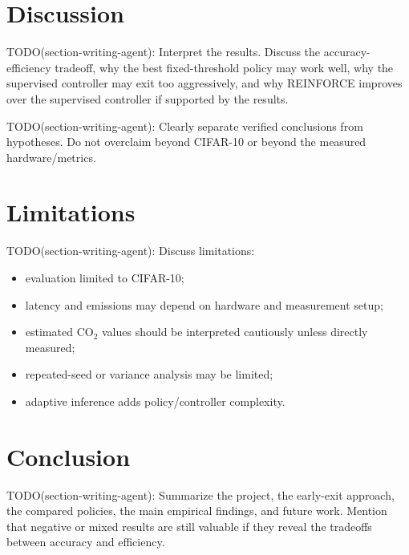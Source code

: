 \documentclass[10pt,twocolumn]{article}
\newcommand{\dataset}{CIFAR-10}
\begin{document}
\section{Discussion}

TODO(section-writing-agent): Interpret the results. Discuss the accuracy-efficiency tradeoff, why the best fixed-threshold policy may work well, why the supervised controller may exit too aggressively, and why REINFORCE improves over the supervised controller if supported by the results.

TODO(section-writing-agent): Clearly separate verified conclusions from hypotheses. Do not overclaim beyond CIFAR-10 or beyond the measured hardware/metrics.

\section{Limitations}

TODO(section-writing-agent): Discuss limitations:
\begin{itemize}
    \item evaluation limited to \dataset{};
    \item latency and emissions may depend on hardware and measurement setup;
    \item estimated CO$_2$ values should be interpreted cautiously unless directly measured;
    \item repeated-seed or variance analysis may be limited;
    \item adaptive inference adds policy/controller complexity.
\end{itemize}

\section{Conclusion}

TODO(section-writing-agent): Summarize the project, the early-exit approach, the compared policies, the main empirical findings, and future work. Mention that negative or mixed results are still valuable if they reveal the tradeoffs between accuracy and efficiency.
\end{document}
